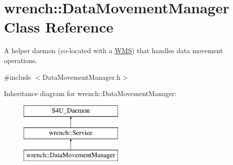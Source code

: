 \hypertarget{classwrench_1_1_data_movement_manager}{}\section{wrench\+:\+:Data\+Movement\+Manager Class Reference}
\label{classwrench_1_1_data_movement_manager}


A helper daemon (co-\/located with a \hyperlink{classwrench_1_1_w_m_s}{W\+MS}) that handles data movement operations.  




{\ttfamily \#include $<$Data\+Movement\+Manager.\+h$>$}

Inheritance diagram for wrench\+:\+:Data\+Movement\+Manager\+:\begin{figure}[H]
\begin{center}
\leavevmode
\includegraphics[height=3.000000cm]{classwrench_1_1_data_movement_manager}
\end{center}
\end{figure}
